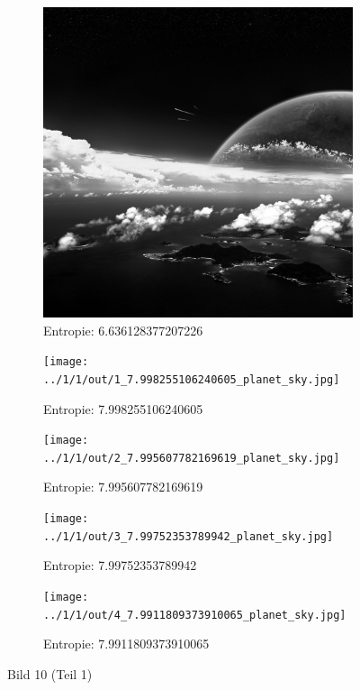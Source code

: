 \begin{figure}
	\centering

	\begin{subfigure}{0.25\textwidth}
		\includegraphics[width=\textwidth]{../1/3/gray_6.636128377207226_planet_sky.jpg}
		\caption{Entropie: 6.636128377207226}
	\end{subfigure}

	\begin{subfigure}{0.25\textwidth}
		\texttt{[image: ../1/1/out/1\_7.998255106240605\_planet\_sky.jpg]}
		\caption{Entropie: 7.998255106240605}
	\end{subfigure}

	\begin{subfigure}{0.25\textwidth}
		\texttt{[image: ../1/1/out/2\_7.995607782169619\_planet\_sky.jpg]}
		\caption{Entropie: 7.995607782169619}
	\end{subfigure}

	\begin{subfigure}{0.25\textwidth}
		\texttt{[image: ../1/1/out/3\_7.99752353789942\_planet\_sky.jpg]}
		\caption{Entropie: 7.99752353789942}
	\end{subfigure}

	\begin{subfigure}{0.25\textwidth}
		\texttt{[image: ../1/1/out/4\_7.9911809373910065\_planet\_sky.jpg]}
		\caption{Entropie: 7.9911809373910065}
	\end{subfigure}
	\caption{Bild 10 (Teil 1)}
\end{figure}
